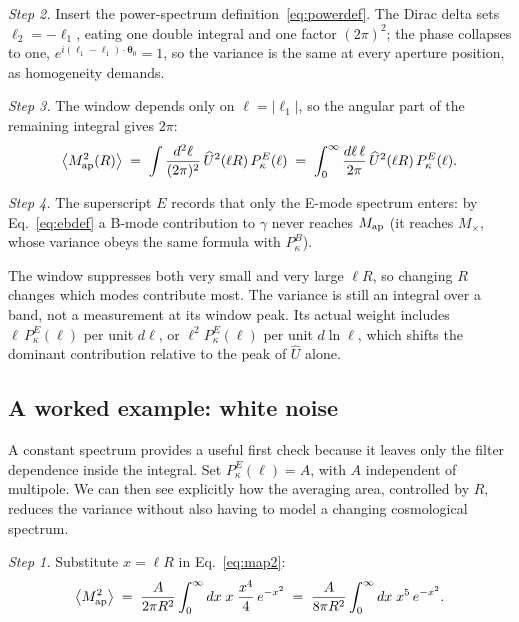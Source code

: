 \documentclass[11pt]{article}
\newcommand{\Map}{M_{\rm ap}}
\newcommand{\Mx}{M_{\times}}
\newcommand{\Uhat}{\widehat{U}}
\newcommand{\btheta}{\boldsymbol{\theta}}
\newcommand{\bell}{\boldsymbol{\ell}}
\numberwithin{equation}{section}
\begin{document}
\emph{Step 2.}  Insert the power-spectrum
definition~\eqref{eq:powerdef}.  The Dirac delta sets
$\bell_2 = -\bell_1$, eating one double integral and one factor
$(2\pi)^2$; the phase collapses to one,
$e^{i(\bell_1 - \bell_1)\cdot\btheta_0} = 1$, so the variance is the
same at every aperture position, as homogeneity demands.

\emph{Step 3.}  The window depends only on $\ell = |\bell_1|$, so the
angular part of the remaining integral gives $2\pi$:
\begin{equation}
  \bigl\langle \Map^2(R) \bigr\rangle
  \;=\; \int \frac{d^2\ell}{(2\pi)^2}\,
  \Uhat^2(\ell R)\, P^E_\kappa(\ell)
  \;=\; \int_0^\infty \frac{d\ell\,\ell}{2\pi}\,
  \Uhat^2(\ell R)\, P^E_\kappa(\ell) .
  \label{eq:map2}
\end{equation}

\emph{Step 4.}  The superscript $E$ records that only the E-mode
spectrum enters: by Eq.~\eqref{eq:ebdef} a B-mode contribution to
$\gamma$ never reaches $\Map$ (it reaches $\Mx$, whose variance obeys
the same formula with $P^B_\kappa$).

The window suppresses both very small and very large $\ell R$, so
changing $R$ changes which modes contribute most. The variance is still
an integral over a band, not a measurement at its window peak. Its actual
weight includes $\ell\,P_\kappa^E(\ell)$ per unit $d\ell$, or
$\ell^2P_\kappa^E(\ell)$ per unit $d\ln\ell$, which shifts the dominant
contribution relative to the peak of $\Uhat$ alone.

\subsection{A worked example: white noise}
\label{sec:whitenoise}

A constant spectrum provides a useful first check because it leaves
only the filter dependence inside the integral. Set
$P^E_\kappa(\ell)=A$, with $A$ independent of multipole. We can then
see explicitly how the averaging area, controlled by $R$, reduces the
variance without also having to model a changing cosmological spectrum.

\emph{Step 1.}  Substitute $x = \ell R$ in Eq.~\eqref{eq:map2}:
\begin{equation}
  \bigl\langle \Map^2 \bigr\rangle
  \;=\; \frac{A}{2\pi R^2}
  \int_0^\infty dx\; x\; \frac{x^4}{4}\, e^{-x^2}
  \;=\; \frac{A}{8\pi R^2}
  \int_0^\infty dx\; x^5\, e^{-x^2} .
  \label{eq:map2whitestep}
\end{equation}
\end{document}
